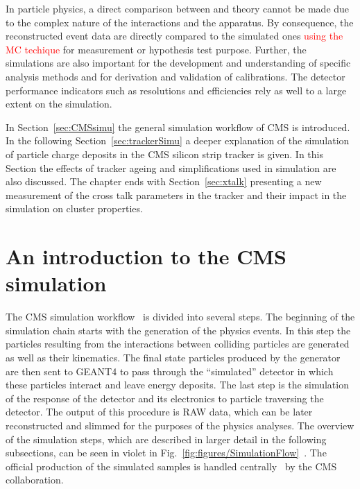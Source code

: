 
\clearpage

\setcounter{secnumdepth}{4}
\setcounter{secnumdepth}{5}

In particle physics, a direct comparison between and theory cannot be made due to the complex nature of the interactions and the apparatus. By consequence, the reconstructed event data are directly compared to the simulated ones \textcolor{red}{using the MC techique} for measurement or hypothesis test purpose. Further, the simulations are also important for the development and understanding of specific analysis methods and for derivation and validation of calibrations. The detector performance indicators such as resolutions and efficiencies rely as well to a large extent on the simulation.

In Section~\ref{sec:CMSsimu} the general simulation workflow of CMS is introduced. In the following Section~\ref{sec:trackerSimu} a deeper explanation of the simulation of particle charge deposits in the CMS silicon strip tracker is given. In this Section the effects of tracker ageing and simplifications used in simulation are also discussed. The chapter ends with Section~\ref{sec:xtalk} presenting a new measurement of the cross talk parameters in the tracker and their impact in the simulation on cluster properties.

\section{An introduction to the CMS simulation~\label{sec:CMSsimu}}

The CMS simulation workflow~\cite{Banerjee:2007zz, Hildreth:2017vpw, Hildreth:2015kps} is divided into several steps. The beginning of the simulation chain starts with the generation of the physics events. In this step the  particles resulting from the interactions between colliding particles are generated as well as their kinematics. The final state particles produced by the generator are then sent to GEANT4 to pass through the ``simulated'' detector in which these particles interact and leave energy deposits. The last step is the simulation of the response of the detector and its electronics to particle traversing the detector. The output of this procedure is RAW data, which can be later reconstructed and slimmed for the purposes of the physics analyses. The overview of the simulation steps, which are described in larger detail in the following subsections, can be seen in violet in Fig.~\ref{fig:figures/SimulationFlow}~\cite{website:simuBasics}. The official production of the simulated samples is handled centrally~\cite{Boudoul:2015bkp} by the CMS collaboration.

